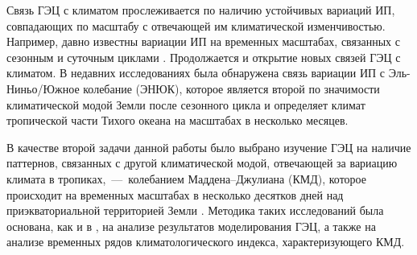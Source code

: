 Связь ГЭЦ с климатом прослеживается по наличию устойчивых вариаций ИП, совпадающих по масштабу с отвечающей им климатической изменчивостью. Например, давно известны вариации ИП на временных масштабах, связанных с сезонным и суточным циклами \cite{Lavigne_et_al_2017}. Продолжается и открытие новых связей ГЭЦ с климатом. В недавних исследованиях \cite{Slyunyaev_et_al_2021a,Slyunyaev_et_al_2021b,Slyunyaev_et_al_2021c} была обнаружена связь вариации ИП с Эль-Ниньо/Южное колебание (ЭНЮК), которое является второй по значимости климатической модой Земли после сезонного цикла и определяет климат тропической части Тихого океана на масштабах в несколько месяцев.

В качестве второй задачи данной работы было выбрано изучение ГЭЦ на наличие паттернов, связанных с другой климатической модой, отвечающей за вариацию климата в тропиках,~---~колебанием Маддена--Джулиана (КМД), которое происходит на временных масштабах в несколько десятков дней над приэкваториальной территорией Земли \cite{Zhang_2005}. Методика таких исследований была основана, как и в \cite{Slyunyaev_et_al_2021a,Slyunyaev_et_al_2021b,Slyunyaev_et_al_2021c}, на анализе результатов моделирования ГЭЦ, а также на анализе временных рядов климатологического индекса, характеризующего КМД.


